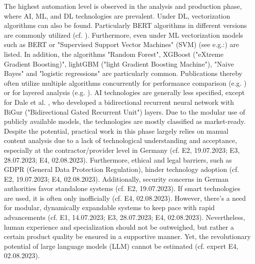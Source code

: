 \documentclass[10pt]{article}
\begin{document}
The highest automation level is observed in the analysis and production phase, where AI, ML, and DL technologies are prevalent.
Under DL, vectorization algorithms can also be found. Particularly BERT algorithms in different versions are commonly utilized
(cf. \cite{Ma.2022,Chen.2023}). Furthermore, even under ML vectorization models such as BERT or
"Supervised Support Vector Machines" (SVM) (see e.g.:\cite{Iorga.2020}) are listed.
In addition, the algorithms "Random Forest", XGBoost ("eXtreme Gradient Boosting)",
lightGBM ("light Gradient Boosting Machine"), "Naive Bayes" and "logistic regressions" are particularly common.
Publications thereby often utilize multiple algorithms concurrently for performance comparison (e.g. \cite{Tao.2023})
or for layered analysis (e.g. \cite{Yang.2022}). AI technologies are generally less specified,
except for Dale et al. \cite{Dale.2023}, who developed a bidirectional recurrent neural network with
BiGur ("Bidirectional Gated Recurrent Unit") layers. Due to the modular use of publicly available models,
the technologies are mostly classified as market-ready. Despite the potential, practical work in this phase
largely relies on manual content analysis due to a lack of technological understanding and acceptance,
especially at the contractor/provider level in Germany (cf. E2, 19.07.2023; E3, 28.07.2023; E4, 02.08.2023). Furthermore,
ethical and legal barriers, such as GDPR (General Data Protection Regulation), hinder technology adoption
(cf. E2, 19.07.2023; E4, 02.08.2023). Additionally, security concerns in German authorities favor
standalone systems (cf. E2, 19.07.2023). If smart technologies are used, it is often only inofficially
(cf. E4, 02.08.2023). However, there's a need for modular, dynamically expandable
systems to keep pace with rapid advancements (cf. E1, 14.07.2023; E3, 28.07.2023; E4, 02.08.2023).
Nevertheless, human experience and specialization should not be outweighed, but rather a certain product quality
be ensured in a supportive manner. Yet, the revolutionary potential of large language models (LLM) cannot be estimated (cf. expert E4, 02.08.2023).
\end{document}
